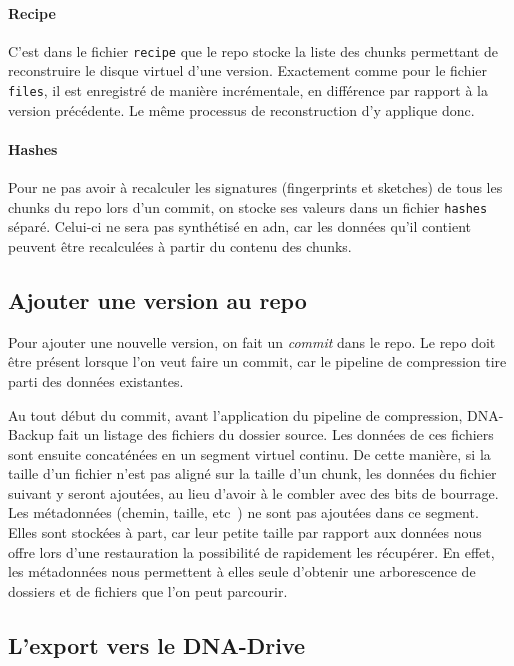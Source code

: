 \documentclass[a4paper]{report}
\begin{document}
\paragraph{Recipe}
C'est dans le fichier \verb|recipe| que le repo stocke la liste des chunks
permettant de reconstruire le disque virtuel d'une version.
Exactement comme pour le fichier \verb|files|, il est enregistré de manière incrémentale,
en différence par rapport à la version précédente.
Le même processus de reconstruction d'y applique donc.

\paragraph{Hashes}
Pour ne pas avoir à recalculer les signatures (fingerprints et sketches) de tous les chunks du repo lors d'un commit,
on stocke ses valeurs dans un fichier \verb|hashes| séparé.
Celui-ci ne sera pas synthétisé en \ac{adn},
car les données qu'il contient peuvent être recalculées à partir du contenu des chunks.


\subsection{Ajouter une version au repo}

Pour ajouter une nouvelle version, on fait un \emph{commit} dans le repo.
Le repo doit être présent lorsque l'on veut faire un commit,
car le pipeline de compression tire parti des données existantes.

Au tout début du commit, avant l'application du pipeline de compression,
DNA-Backup fait un listage des fichiers du dossier source.
Les données de ces fichiers sont ensuite concaténées en un segment virtuel continu.
De cette manière, si la taille d'un fichier n'est pas aligné sur la taille d'un chunk,
les données du fichier suivant y seront ajoutées, au lieu d'avoir à le combler avec des bits de bourrage.
Les métadonnées (chemin, taille, etc~\textellipsis) ne sont pas ajoutées dans ce segment.
Elles sont stockées à part, car leur petite taille par rapport aux données nous offre lors d'une restauration
la possibilité de rapidement les récupérer.
En effet, les métadonnées nous permettent à elles seule d'obtenir une arborescence de dossiers et de fichiers que l'on peut parcourir.

\subsection{L'export vers le DNA-Drive}
\end{document}
